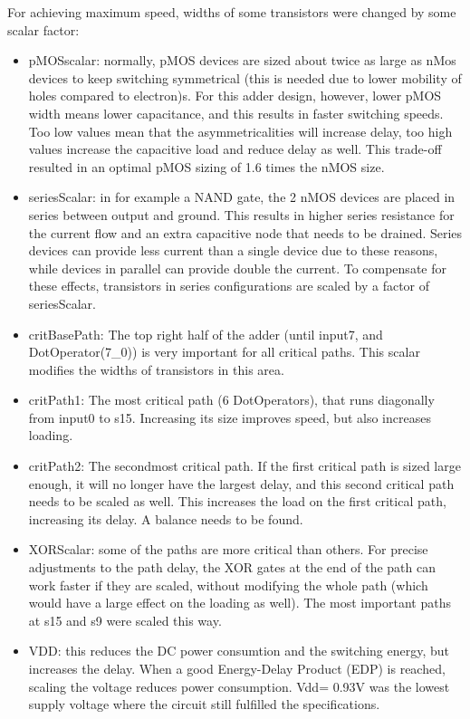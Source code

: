 \documentclass[english]{article}
\begin{document}
\begin{enumerate}
For achieving maximum speed, widths of some transistors were changed by some scalar factor:
\begin{itemize}
\item pMOSscalar: normally, pMOS devices are sized about twice as large as nMos devices to keep switching symmetrical (this is needed due to lower mobility of holes compared to electron)s. For this adder design, however, lower pMOS width means lower capacitance, and this results in faster switching speeds. Too low values mean that the asymmetricalities will increase delay, too high values increase the capacitive load and reduce delay as well. This trade-off resulted in an optimal pMOS sizing of 1.6 times the nMOS size.
\item seriesScalar: in for example a NAND gate, the 2 nMOS devices are placed in series between output and ground. This results in higher series resistance for the current flow and an extra capacitive node that needs to be drained. Series devices can provide less current than a single device due to these reasons, while devices in parallel can provide double the current. To compensate for these effects, transistors in series configurations are scaled by a factor of seriesScalar.
\item critBasePath: The top right half of the adder (until input7, and DotOperator(7\_0)) is very important for all critical paths. This scalar modifies the widths of transistors in this area.
\item critPath1: The most critical path (6 DotOperators), that runs diagonally from input0 to s15. Increasing its size improves speed, but also increases loading.
\item critPath2: The secondmost critical path. If the first critical path is sized large enough, it will no longer have the largest delay, and this second critical path needs to be scaled as well. This increases the load on the first critical path, increasing its delay. A balance needs to be found.
\item XORScalar: some of the paths are more critical than others. For precise adjustments to the path delay, the XOR gates at the end of the path can work faster if they are scaled, without modifying the whole path (which would have a large effect on the loading as well). The most important paths at s15 and s9 were scaled this way.
\item VDD: this reduces the DC power consumtion and the switching energy, but increases the delay. When a good Energy-Delay Product (EDP) is reached, scaling the voltage reduces power consumption. Vdd= 0.93V was the lowest supply voltage where the circuit still fulfilled the specifications.
 
\end{itemize} %


\end{enumerate} %
\end{document}
